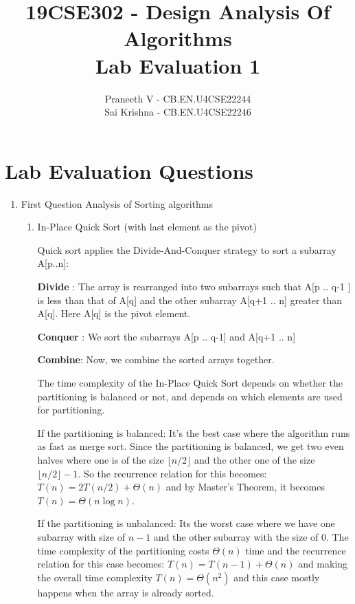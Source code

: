 \documentclass{article}
\title{19CSE302 - Design Analysis Of Algorithms \\ Lab Evaluation 1}
\author{Praneeth V - CB.EN.U4CSE22244 \\ Sai Krishna - CB.EN.U4CSE22246}
\begin{document}
\maketitle

\section*{Lab Evaluation Questions}

\begin{enumerate}
    \item First Question
    Analysis of Sorting algorithms
    \begin{enumerate}[label*=\arabic*.]
        \item In-Place Quick Sort (with last element as the pivot)

        Quick sort applies the Divide-And-Conquer strategy to sort a subarray A[p..n]:


        \textbf{Divide} : The array is rearranged into two subarrays such that A[p .. q-1 ] is less than that of A[q] and the other subarray A[q+1 .. n] 
        greater than A[q]. Here A[q] is the pivot element.

        \textbf{Conquer} : We sort the subarrays A[p .. q-1] and A[q+1 .. n]

        \textbf{Combine}: Now, we combine the sorted arrays together. 

        The time complexity of the In-Place Quick Sort depends on whether the partitioning is balanced or not, and depends on which elements are used for partitioning. 

        If the partitioning is balanced: It's the best case where the algorithm runs as fast as merge sort. Since the partitioning is balanced, we get two even halves where one is of the size \( \lfloor n/2 \rfloor \) and the other one of the size \( \lfloor n/2 \rfloor - 1 \). So the recurrence relation for this becomes: \( T(n) = 2 T(n/2) + \Theta(n) \) and by Master's Theorem, it becomes \( T(n) = \Theta(n \log n) \). 

        If the partitioning is unbalanced: Its the worst case where we have one subarray with size of \( n-1 \) and the other subarray with the size of 0. The time complexity of the partitioning costs \( \Theta(n) \) time and the recurrence relation for this case becomes:
        \( T(n) = T(n - 1) + \Theta(n) \) and making the overall time complexity \( T(n) = \Theta(n^2) \) and this case mostly happens when the array is already sorted. 


\end{enumerate}
\end{enumerate}
\end{document}
